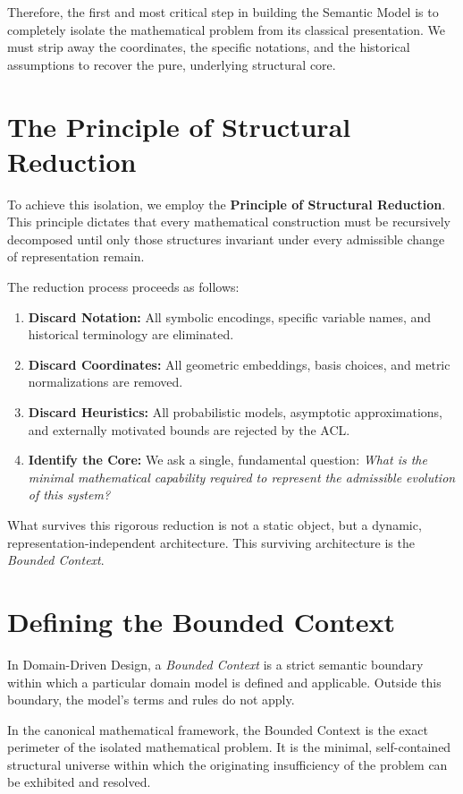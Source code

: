 \documentclass[12pt,openany]{extbook}
\theoremstyle{plain}
\theoremstyle{definition}
\begin{document}
Therefore, the first and most critical step in building the Semantic Model is to completely isolate the mathematical problem from its classical presentation. We must strip away the coordinates, the specific notations, and the historical assumptions to recover the pure, underlying structural core.

\section{The Principle of Structural Reduction}

To achieve this isolation, we employ the \textbf{Principle of Structural Reduction}. This principle dictates that every mathematical construction must be recursively decomposed until only those structures invariant under every admissible change of representation remain.

The reduction process proceeds as follows:
\begin{enumerate}
    \item \textbf{Discard Notation:} All symbolic encodings, specific variable names, and historical terminology are eliminated.
    \item \textbf{Discard Coordinates:} All geometric embeddings, basis choices, and metric normalizations are removed.
    \item \textbf{Discard Heuristics:} All probabilistic models, asymptotic approximations, and externally motivated bounds are rejected by the ACL.
    \item \textbf{Identify the Core:} We ask a single, fundamental question: \emph{What is the minimal mathematical capability required to represent the admissible evolution of this system?}
\end{enumerate}

What survives this rigorous reduction is not a static object, but a dynamic, representation-independent architecture. This surviving architecture is the \emph{Bounded Context}.

\section{Defining the Bounded Context}

In Domain-Driven Design, a \emph{Bounded Context} is a strict semantic boundary within which a particular domain model is defined and applicable. Outside this boundary, the model's terms and rules do not apply.

In the canonical mathematical framework, the Bounded Context is the exact perimeter of the isolated mathematical problem. It is the minimal, self-contained structural universe within which the originating insufficiency of the problem can be exhibited and resolved.
\end{document}

